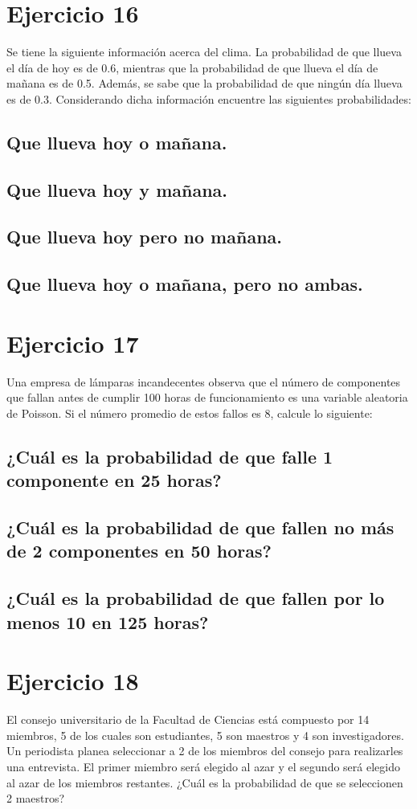 \documentclass[12pt]{article}
\begin{document}
\section{Ejercicio 16}
Se tiene la siguiente información acerca del clima. La probabilidad de que llueva el día de hoy
es de 0.6, mientras que la probabilidad de que llueva el día de mañana es de 0.5. Además, se
sabe que la probabilidad de que ningún día llueva es de 0.3. Considerando dicha información
encuentre las siguientes probabilidades:
\subsection{Que llueva hoy o mañana.}
\subsection{Que llueva hoy y mañana.}
\subsection{Que llueva hoy pero no mañana.}
\subsection{Que llueva hoy o mañana, pero no ambas.}
\section{Ejercicio 17}
Una empresa de lámparas incandecentes observa que el número de componentes que fallan
antes de cumplir 100 horas de funcionamiento es una variable aleatoria de Poisson. Si el
número promedio de estos fallos es 8, calcule lo siguiente:
\subsection{¿Cuál es la probabilidad de que falle 1 componente en 25 horas?}
\subsection{¿Cuál es la probabilidad de que fallen no más de 2 componentes en 50 horas?}
\subsection{¿Cuál es la probabilidad de que fallen por lo menos 10 en 125 horas?}
\section{Ejercicio 18}
 El consejo universitario de la Facultad de Ciencias está compuesto por 14 miembros, 5 de los
cuales son estudiantes, 5 son maestros y 4 son investigadores. Un periodista planea seleccionar
a 2 de los miembros del consejo para realizarles una entrevista. El primer miembro será elegido
al azar y el segundo será elegido al azar de los miembros restantes. ¿Cuál es la probabilidad
de que se seleccionen 2 maestros?
\end{document}
